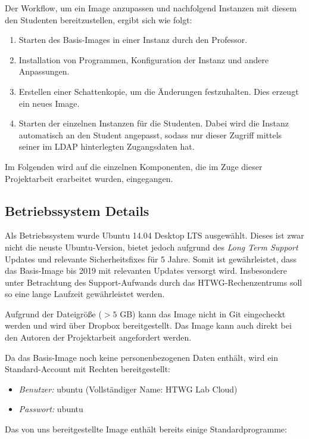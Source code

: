 Der Workflow, um ein Image anzupassen und nachfolgend Instanzen mit diesem den Studenten bereitzustellen, ergibt sich wie folgt:

\begin{enumerate}
\item Starten des Basis-Images in einer Instanz durch den Professor.
\item Installation von Programmen, Konfiguration der Instanz und andere Anpassungen.
\item Erstellen einer Schattenkopie, um die Änderungen festzuhalten. Dies erzeugt ein neues Image.
\item Starten der einzelnen Instanzen für die Studenten. Dabei wird die Instanz automatisch an den Student angepasst, sodass nur dieser Zugriff mittels seiner im LDAP hinterlegten Zugangsdaten hat.
\end{enumerate}

Im Folgenden wird auf die einzelnen Komponenten, die im Zuge dieser Projektarbeit erarbeitet wurden, eingegangen. 

\subsection{Betriebssystem Details}

Als Betriebssystem wurde Ubuntu 14.04 Desktop LTS ausgewählt. 
Dieses ist zwar nicht die neuste Ubuntu-Version, bietet jedoch aufgrund des \emph{Long Term Support} Updates und relevante Sicherheitsfixes für 5 Jahre. 
Somit ist gewährleistet, dass das Basis-Image bis 2019 mit relevanten Updates versorgt wird. 
Insbesondere unter Betrachtung des Support-Aufwands durch das HTWG-Rechenzentrums soll so eine lange Laufzeit gewährleistet werden.

Aufgrund der Dateigröße ($> 5$ GB) kann das Image nicht in Git eingecheckt werden und wird über Dropbox \cite{dropboxImage} bereitgestellt. Das Image kann auch direkt bei den Autoren der Projektarbeit angefordert werden.

Da das Basis-Image noch keine personenbezogenen Daten enthält, wird ein Standard-Account mit  Rechten bereitgestellt:

\begin{itemize}
\item \emph{Benutzer:} ubuntu (Vollständiger Name: HTWG Lab Cloud)
\item \emph{Passwort:} ubuntu
\end{itemize}

Das von uns bereitgestellte Image enthält bereits einige Standardprogramme:

